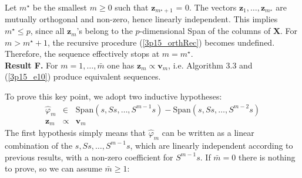 \noindent Let $m ^{\star}$ be the smallest $m \geq 0$ such that $\mathbf{z}_{m ^{\star} + 1}$ = 0. The vectors $\mathbf{z}_1, \ldots, \mathbf{z}_{m ^{\star}}$ are mutually orthogonal and non-zero, hence
linearly independent. This implies $m ^{\star} \leq p$, since all $\mathbf{z}_m$'s belong to the
$p$-dimensional Span of the columns of $\mathbf{X}$. 
For $m > m ^{\star} + 1$, the recursive procedure (\ref{3p15_orthRec}) becomes undefined. Therefore,
the sequence effectively stops at $m = m ^{\star}$.
\vspace{0.5cm}\\
\textbf{Result F.} For $m = 1, \ldots, \bar{m}$ one has $\mathbf{z}_m \propto \mathbf{v}_m$, i.e. Algorithm 3.3 and (\ref{3p15_e10}) produce equivalent sequences.

\noindent To prove this key point, we adopt two inductive hypotheses:
\begin{eqnarray}
\label{3p15_ip1}
\hat{\varphi}_m & \in & \textrm{Span} \left( s, Ss, \ldots, S^{m - 1} s \right) - \textrm{Span} \left( s, Ss, \ldots, S^{m - 2} s \right)\\
\mathbf{z}_m & \propto & \mathbf{v}_m
\end{eqnarray}
The first hypothesis simply means that $\hat{\varphi}_m$ can be written as a linear combination of the $s, Ss, \ldots, S^{m - 1} s$, which are linearly independent
according to previous results, with a non-zero coefficient for $S^{m - 1} s$. If $ \bar{m} = 0$ there is nothing to prove, so we can assume $\bar{m} \geq 1$:
